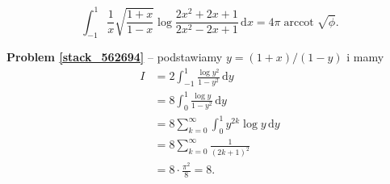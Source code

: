%

\begin{problem}[pytanie 562694]
    \label{stack_562694}%
    \begin{equation}
        \int_{-1}^1 \frac{1}{x} \sqrt{\frac{1+x}{1-x}} \log \frac{2x^2+2x+1}{2x^2-2x+1} \,\mathrm{d}x = 4 \pi \operatorname{arccot} \sqrt{\phi}.
    \end{equation}
\end{problem}

\textbf{Problem \ref{stack_562694}} -- podstawiamy $y = (1+x) / (1-y)$ i mamy %
\begin{align} %
    I & = 2 \int_{-1}^1 \frac{\log y^2}{1-y^2} \,\mathrm{d}y \\ %
        & = 8 \int_0^1 \frac{\log y}{1-y^2} \, \mathrm{d}{y} \\ %
        & = 8 \sum_{k=0}^\infty \int_0^1 y^{2k} \log y \,\mathrm{d} y \\ %
        & = 8 \sum_{k=0}^\infty \frac{1}{(2k+1)^2} \\ %
        & = 8 \cdot \frac{\pi^2}{8} = 8. %
\end{align} %

%